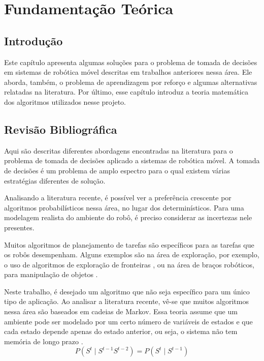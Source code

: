 
\chapter{Fundamentação Teórica} \label{chap:FundamentacaoMatematica}



\section{Introdução}

Este capítulo apresenta algumas soluções para o problema de tomada de decisões em sistemas de robótica móvel descritas em trabalhos anteriores nessa área. Ele aborda, também, o problema de aprendizagem por reforço e algumas alternativas relatadas na literatura. Por último, esse capítulo introduz a teoria matemática dos algoritmos utilizados nesse projeto.


\section{Revisão Bibliográfica} \label{section:RevisaoBibliografica}

Aqui são descritas diferentes abordagens encontradas na literatura para o problema de tomada de decisões aplicado a sistemas de robótica móvel. A tomada de decisões é um problema de amplo espectro para o qual existem várias estratégias diferentes de solução.

Analisando a literatura recente, é possível ver a preferência crescente por algoritmos probabilísticos nessa área, no lugar dos determinísticos. Para uma modelagem realista do ambiente do robô, é preciso considerar as incertezas nele presentes.

Muitos algoritmos de planejamento de tarefas são específicos para as tarefas que os robôs desempenham. Alguns exemplos são na área de exploração, por exemplo, o uso de algoritmos de exploração de fronteiras \cite{conf:icra:FredaO05,Yamauchi:1998:FEU,Yamauchi:1997:FAA}, ou na área de braços robóticos, para manipulação de objetos \cite{Berenson_2009_6465}.

Neste trabalho, é desejado um algoritmo que não seja específico para um único tipo de aplicação. Ao analisar a literatura recente, vê-se que muitos algoritmos nessa área são baseados em cadeias de Markov. Essa teoria assume que um ambiente pode ser modelado por um certo número de variáveis de estados e que cada estado depende apenas do estado anterior, ou seja, o sistema não tem memória de longo prazo \cite{books:daglib:0095301}.
\begin{equation}
	P(S^t\mid S^{t-1}S^{t-2})=P(S^t\mid S^{t-1})
\end{equation}

